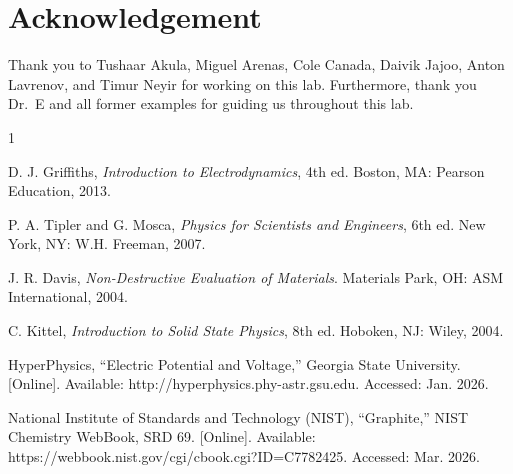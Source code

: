 \documentclass[10pt,draftcls,journal,onecolumn]{IEEEtran}
\begin{document}
\section{Acknowledgement}

Thank you to Tushaar Akula, Miguel Arenas, Cole Canada, Daivik Jajoo, Anton Lavrenov, and Timur Neyir for working on this lab. Furthermore, thank you Dr.\ E and all former examples for guiding us throughout this lab.

\begin{thebibliography}{1}

D. J. Griffiths, \textit{Introduction to Electrodynamics}, 4th ed. Boston, MA: Pearson Education, 2013.

P. A. Tipler and G. Mosca, \textit{Physics for Scientists and Engineers}, 6th ed. New York, NY: W.H. Freeman, 2007.

J. R. Davis, \textit{Non-Destructive Evaluation of Materials}. Materials Park, OH: ASM International, 2004.

C. Kittel, \textit{Introduction to Solid State Physics}, 8th ed. Hoboken, NJ: Wiley, 2004.

HyperPhysics, “Electric Potential and Voltage,” Georgia State University. [Online]. Available: http://hyperphysics.phy-astr.gsu.edu. Accessed: Jan. 2026.

National Institute of Standards and Technology (NIST), “Graphite,” NIST Chemistry WebBook, SRD 69. [Online]. Available: https://webbook.nist.gov/cgi/cbook.cgi?ID=C7782425. Accessed: Mar. 2026.

\end{thebibliography}
\end{document}
